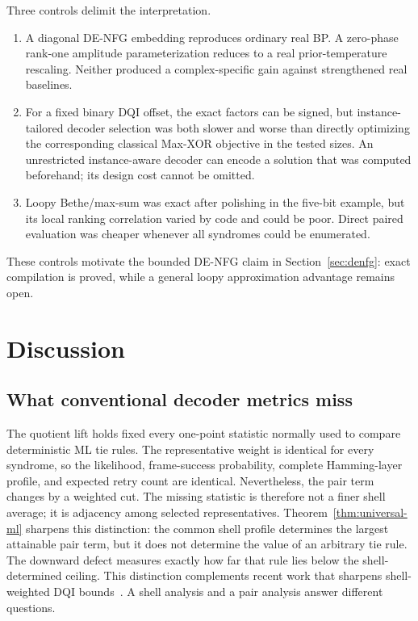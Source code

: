 \documentclass[journal]{IEEEtran}
\theoremstyle{definition}
\theoremstyle{remark}
\begin{document}
Three controls delimit the interpretation.

\begin{enumerate}
\item A diagonal DE-NFG embedding reproduces ordinary real BP.  A zero-phase
rank-one amplitude parameterization reduces to a real prior-temperature
rescaling.  Neither produced a complex-specific gain against strengthened
real baselines.

\item For a fixed binary DQI offset, the exact factors can be signed, but
instance-tailored decoder selection was both slower and worse than directly
optimizing the corresponding classical Max-XOR objective in the tested
sizes.  An unrestricted instance-aware decoder can encode a solution that was
computed beforehand; its design cost cannot be omitted.

\item Loopy Bethe/max-sum was exact after polishing in the five-bit example,
but its local ranking correlation varied by code and could be poor.  Direct
paired evaluation was cheaper whenever all syndromes could be enumerated.
\end{enumerate}

These controls motivate the bounded DE-NFG claim in
Section~\ref{sec:denfg}: exact compilation is proved, while a general loopy
approximation advantage remains open.

\section{Discussion}
\label{sec:discussion}

\subsection{What conventional decoder metrics miss}

The quotient lift holds fixed every one-point statistic normally used to
compare deterministic ML tie rules.  The representative weight is identical
for every syndrome, so the likelihood, frame-success probability, complete
Hamming-layer profile, and expected retry count are identical.  Nevertheless,
the pair term changes by a weighted cut.  The missing statistic is therefore
not a finer shell average; it is adjacency among selected representatives.
Theorem~\ref{thm:universal-ml} sharpens this distinction: the common shell
profile determines the largest attainable pair term, but it does not determine
the value of an arbitrary tie rule.  The downward defect measures exactly how
far that rule lies below the shell-determined ceiling.
This distinction complements recent work that sharpens shell-weighted DQI
bounds~\cite{gao2026}.  A shell analysis and a pair analysis answer different
questions.
\end{document}
